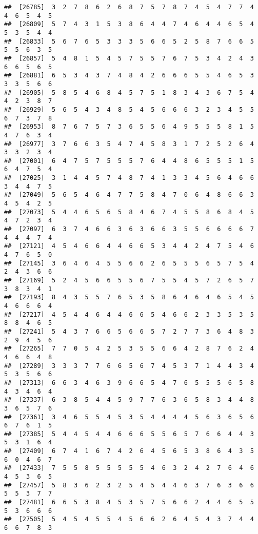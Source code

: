 \documentclass[
]{book}
\begin{document}
\begin{verbatim}
##  [26785]  3  2  7  8  6  2  6  8  7  5  7  8  7  4  5  4  7  7  4  4  6  5  4  5
##  [26809]  5  7  4  3  1  5  3  8  6  4  4  7  4  6  4  4  6  5  4  5  3  5  4  4
##  [26833]  5  6  7  6  5  3  3  3  5  6  6  5  2  5  8  7  6  6  5  5  5  6  3  5
##  [26857]  5  4  8  1  5  4  5  7  5  5  7  6  7  5  3  4  2  4  3  6  6  5  6  5
##  [26881]  6  5  3  4  3  7  4  8  4  2  6  6  6  5  5  4  6  5  3  3  3  5  6  6
##  [26905]  5  8  5  4  6  8  4  5  7  5  1  8  3  4  3  6  7  5  4  4  2  3  8  7
##  [26929]  5  6  5  4  3  4  8  5  4  5  6  6  6  3  2  3  4  5  5  6  7  3  7  8
##  [26953]  8  7  6  7  5  7  3  6  5  5  6  4  9  5  5  5  8  1  5  4  7  6  3  4
##  [26977]  3  7  6  6  3  5  4  7  4  5  8  3  1  7  2  5  2  6  4  3  3  2  3  4
##  [27001]  6  4  7  5  7  5  5  5  7  6  4  4  8  6  5  5  5  1  5  6  4  7  5  4
##  [27025]  3  1  4  4  5  7  4  8  7  4  1  3  3  4  5  6  4  6  6  3  4  4  7  5
##  [27049]  5  6  5  4  6  4  7  7  5  8  4  7  0  6  4  8  6  6  3  4  5  4  2  5
##  [27073]  5  4  4  6  5  6  5  8  4  6  7  4  5  5  8  6  8  4  5  4  7  2  3  4
##  [27097]  6  3  7  4  6  6  3  6  3  6  6  3  5  5  6  6  6  6  7  4  4  4  7  4
##  [27121]  4  5  4  6  6  4  4  6  6  5  3  4  4  2  4  7  5  4  6  4  7  6  5  0
##  [27145]  3  6  4  6  4  5  5  6  6  2  6  5  5  5  6  5  7  5  4  2  4  3  6  6
##  [27169]  5  2  4  5  6  6  5  5  6  7  5  5  4  5  7  2  6  5  7  3  8  3  4  1
##  [27193]  8  4  3  5  5  7  6  5  3  5  8  6  4  6  4  6  5  4  5  4  6  6  6  4
##  [27217]  4  5  4  4  6  4  4  6  6  5  4  6  6  2  3  3  5  3  5  8  8  4  6  5
##  [27241]  5  4  3  7  6  6  5  6  6  5  7  2  7  7  3  6  4  8  3  2  9  4  5  6
##  [27265]  7  7  0  5  4  2  5  3  5  5  6  6  4  2  8  7  6  2  4  4  6  6  4  8
##  [27289]  3  3  3  7  7  6  6  5  6  7  4  5  3  7  1  4  4  3  4  5  3  5  6  6
##  [27313]  6  6  3  4  6  3  9  6  6  5  4  7  6  5  5  5  6  5  8  4  3  4  6  4
##  [27337]  6  3  8  5  4  4  5  9  7  7  6  3  6  5  8  3  4  4  8  3  6  5  7  6
##  [27361]  3  4  6  5  5  4  5  3  5  4  4  4  4  5  6  3  6  5  6  6  7  6  1  5
##  [27385]  5  4  4  5  4  4  6  6  6  5  5  6  5  7  6  6  4  4  3  5  3  1  6  4
##  [27409]  6  7  4  1  6  7  4  2  6  4  5  6  5  3  8  6  4  3  5  6  0  4  6  7
##  [27433]  7  5  5  8  5  5  5  5  5  4  6  3  2  4  2  7  6  4  6  4  5  3  6  5
##  [27457]  5  8  3  6  2  3  2  5  4  5  4  4  6  3  7  6  3  6  6  5  5  3  7  7
##  [27481]  6  6  5  3  8  4  5  3  5  7  5  6  6  2  4  4  6  5  5  5  3  6  6  6
##  [27505]  5  4  5  4  5  5  4  5  6  6  2  6  4  5  4  3  7  4  4  6  6  7  8  3

\end{verbatim}
\end{document}
